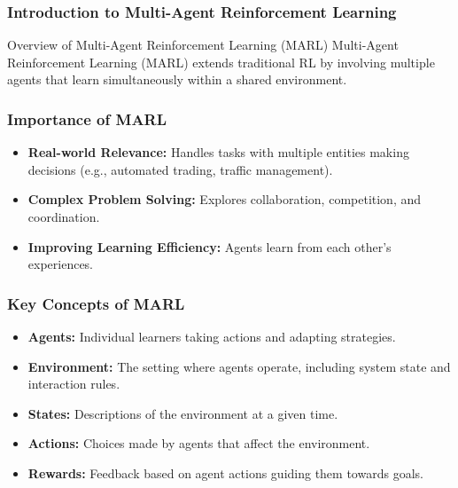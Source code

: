 \documentclass[aspectratio=169]{beamer}
\begin{document}
\frame{\titlepage}

\begin{frame}[fragile]
    \frametitle{Introduction to Multi-Agent Reinforcement Learning}
    \begin{block}{Overview of Multi-Agent Reinforcement Learning (MARL)}
        Multi-Agent Reinforcement Learning (MARL) extends traditional RL by involving multiple agents that learn simultaneously within a shared environment.
    \end{block}
\end{frame}

\begin{frame}[fragile]
    \frametitle{Importance of MARL}
    \begin{itemize}
        \item \textbf{Real-world Relevance:} Handles tasks with multiple entities making decisions (e.g., automated trading, traffic management).
        \item \textbf{Complex Problem Solving:} Explores collaboration, competition, and coordination.
        \item \textbf{Improving Learning Efficiency:} Agents learn from each other’s experiences.
    \end{itemize}
\end{frame}

\begin{frame}[fragile]
    \frametitle{Key Concepts of MARL}
    \begin{itemize}
        \item \textbf{Agents:} Individual learners taking actions and adapting strategies.
        \item \textbf{Environment:} The setting where agents operate, including system state and interaction rules.
        \item \textbf{States:} Descriptions of the environment at a given time.
        \item \textbf{Actions:} Choices made by agents that affect the environment.
        \item \textbf{Rewards:} Feedback based on agent actions guiding them towards goals.
    \end{itemize}
\end{frame}
\end{document}

